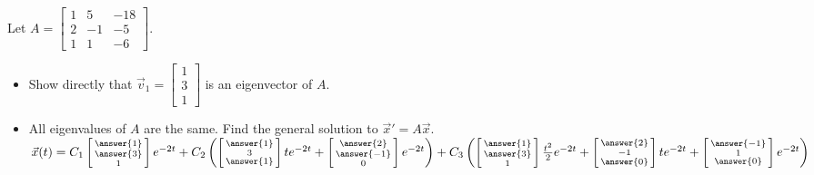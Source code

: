 \documentclass{ximera}
\begin{document}
\begin{exercise}
    Let $A=\begin{bmatrix} 1&5&-18\\ 2&-1&-5 \\ 1&1&-6 \end{bmatrix}$. 
    \begin{itemize}
        \item Show directly that $\vec{v}_1=\begin{bmatrix} 1\\3\\1 \end{bmatrix}$ is an eigenvector of $A$.
        \item All eigenvalues of $A$ are the same. Find the general solution to ${\vec{x}}'=A\vec{x}$.\\
            $\vec{x}(t) = C_1\left[\begin{smallmatrix} \answer{1} \\ \answer{3} \\1 \end{smallmatrix}\right]e^{-2t} + C_2\left(\left[\begin{smallmatrix} \answer{1} \\ 3 \\ \answer{1} \end{smallmatrix}\right] te^{-2t} + \left[\begin{smallmatrix} \answer{2} \\ \answer{-1} \\ 0 \end{smallmatrix}\right]e^{-2t}\right) + C_3\left( \left[\begin{smallmatrix} \answer{1} \\ \answer{3} \\1 \end{smallmatrix}\right] \frac{t^2}{2}e^{-2t} + \left[\begin{smallmatrix} \answer{2} \\ -1 \\ \answer{0} \end{smallmatrix}\right]te^{-2t} + \left[\begin{smallmatrix} \answer{-1} \\ 1 \\ \answer{0} \end{smallmatrix}\right] e^{-2t}\right)$
    \end{itemize}
\end{exercise}
\end{document}
